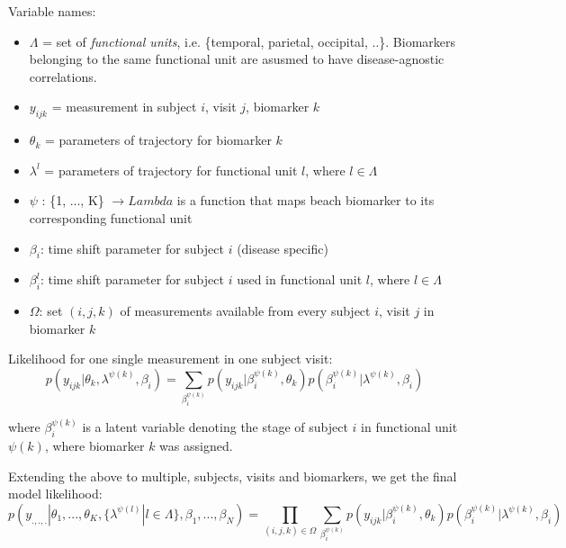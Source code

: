 \documentclass{llncs}
\begin{document}
Variable names:
\begin{itemize}
 \item $\Lambda$ = set of \emph{functional units}, i.e. \{temporal, parietal, occipital, ..\}. Biomarkers belonging to the same functional unit are asusmed to have disease-agnostic correlations.
 \item $y_{ijk}$ = measurement in subject $i$, visit $j$, biomarker $k$
 \item $\theta_k$ = parameters of trajectory for biomarker $k$
 \item $\lambda^l$ = parameters of trajectory for functional unit $l$, where $l \in \Lambda$
 \item $\psi$ : \{1, ..., K\} $ \rightarrow Lambda$ is a function that maps beach biomarker to its corresponding functional unit
 \item $\beta_i$: time shift parameter for subject $i$ (disease specific)
 \item $\beta_i^{l}$: time shift parameter for subject $i$ used in functional unit $l$, where $l \in \Lambda$
 \item $\Omega$: set ${(i,j,k)}$ of measurements available from every subject $i$, visit $j$ in biomarker $k$
\end{itemize}

Likelihood for one single measurement in one subject visit: 
\begin{equation}
 p(y_{ijk}|\theta_k, \lambda^{\psi(k)}, \beta_i) = \sum_{\beta_i^{\psi(k)}} p(y_{ijk}| \beta_i^{\psi(k)}, \theta_k) p(\beta_i^{\psi(k)}| \lambda^{\psi(k)}, \beta_i)
\end{equation}

where $\beta_i^{\psi(k)}$ is a latent variable denoting the stage of subject $i$ in functional unit $\psi(k)$, where biomarker $k$ was assigned.

Extending the above to multiple, subjects, visits and biomarkers, we get the final model likelihood:
\begin{equation}
 p(y_{.,.,.}|\theta_1, ..., \theta_K, \{\lambda^{\psi(l)} | l \in \Lambda \}, \beta_1, ..., \beta_N) = \prod_{(i,j,k) \in \Omega} \sum_{\beta_i^{\psi(k)}} p(y_{ijk}| \beta_i^{\psi(k)}, \theta_k) p(\beta_i^{\psi(k)}| \lambda^{\psi(k)}, \beta_i)
\end{equation}
\end{document}
